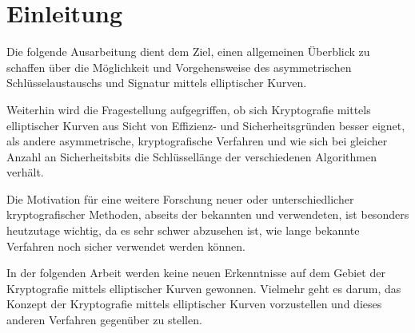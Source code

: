 \chapter{Einleitung}

Die folgende Ausarbeitung dient dem Ziel, einen allgemeinen Überblick zu schaffen über 
die Möglichkeit und Vorgehensweise des asymmetrischen Schlüsselaustauschs und Signatur mittels elliptischer Kurven.

Weiterhin wird die Fragestellung aufgegriffen, ob sich Kryptografie mittels elliptischer Kurven
aus Sicht von Effizienz- und Sicherheitsgründen besser eignet, als andere asymmetrische, 
kryptografische Verfahren und wie sich bei gleicher Anzahl an Sicherheitsbits die Schlüssellänge der verschiedenen Algorithmen verhält.

Die Motivation für eine weitere Forschung neuer oder unterschiedlicher kryptografischer Methoden,
abseits der bekannten und verwendeten, ist besonders heutzutage wichtig, da es sehr schwer
abzusehen ist, wie lange bekannte Verfahren noch sicher verwendet werden können.

In der folgenden Arbeit werden keine neuen Erkenntnisse auf dem Gebiet der Kryptografie mittels elliptischer Kurven gewonnen.
Vielmehr geht es darum, das Konzept der Kryptografie mittels elliptischer Kurven vorzustellen und dieses anderen Verfahren gegenüber zu stellen.
